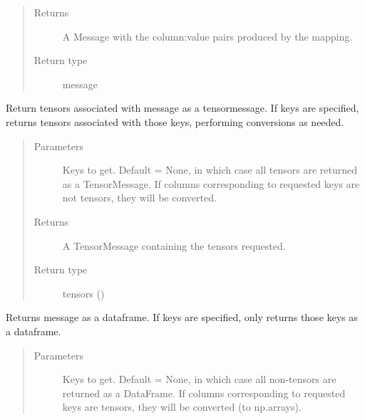 \documentclass[letterpaper,10pt,english]{sphinxmanual}
\begin{document}
\begin{fulllineitems}
\begin{fulllineitems}
\begin{quote}
\begin{description}
\item[{Returns}] \leavevmode
A Message with the column:value pairs produced by the mapping.

\item[{Return type}] \leavevmode
message

\end{description}\end{quote}

\end{fulllineitems}


\begin{fulllineitems}
\label{\detokenize{Fireworks:Fireworks.core.message.Message.tensors}}
Return tensors associated with message as a tensormessage.
If keys are specified, returns tensors associated with those keys, performing conversions as needed.
\begin{quote}\begin{description}
\item[{Parameters}] \leavevmode
{} \textendash{} Keys to get. Default = None, in which case all tensors are returned as a TensorMessage.
If columns corresponding to requested keys are not tensors, they will be converted.

\item[{Returns}] \leavevmode
A TensorMessage containing the tensors requested.

\item[{Return type}] \leavevmode
tensors ({\hyperref[\detokenize{Fireworks:Fireworks.core.message.TensorMessage}]{}})

\end{description}\end{quote}

\end{fulllineitems}


\begin{fulllineitems}
\label{\detokenize{Fireworks:Fireworks.core.message.Message.dataframe}}
Returns message as a dataframe. If keys are specified, only returns those keys as a dataframe.
\begin{quote}\begin{description}
\item[{Parameters}] \leavevmode
{} \textendash{} Keys to get. Default = None, in which case all non-tensors are returned as a DataFrame.
If columns corresponding to requested keys are tensors, they will be converted (to np.arrays).


\end{description}
\end{quote}
\end{fulllineitems}
\end{fulllineitems}
\end{document}
